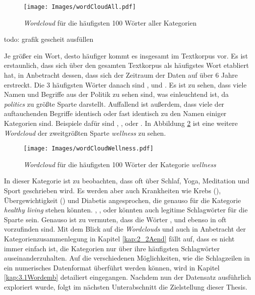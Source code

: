 \documentclass[a4paper,11pt]{article}
\begin{document}
\begin{figure}[ht]
    \centering
\texttt{[image: Images/wordCloudAll.pdf]} 
\label{abb:WordcloudAll}
\caption{\textit{Wordcloud} für die häufigsten 100 Wörter aller Kategorien}
\end{figure}
todo: grafik gescheit ausfüllen

Je größer ein Wort, desto häufiger kommt es insgesamt im Textkorpus vor. Es ist erstaunlich, dass  sich über den gesamten Textkorpus als häufigstes Wort etabliert hat, in Anbetracht dessen, dass sich der Zeitraum der Daten auf über $6$ Jahre erstreckt. Die $3$ häufigsten Wörter danach sind ,  und . Es ist zu sehen, dass viele Namen und Begriffe aus der Politik zu sehen sind, was einleuchtend ist, da \textit{politics} zu größte Sparte darstellt. 
Auffallend ist außerdem, dass viele der auftauchenden Begriffe identisch oder fast identisch zu den Namen einiger Kategorien sind. Beispiele dafür sind , ,  oder . In Abbildung \ref{abb:WordcloudWellness} ist eine weitere \textit{Wordcloud} der zweitgrößten Sparte \textit{wellness} zu sehen.


\begin{figure}[ht]
    \centering
\texttt{[image: Images/wordCloudWellness.pdf]} 
\label{abb:WordcloudWellness}
\caption{\textit{Wordcloud} für die häufigsten 100 Wörter der Kategorie \textit{wellness}}
\end{figure}

In dieser Kategorie ist zu beobachten, dass oft über Schlaf, Yoga, Meditation und Sport geschrieben wird. Es werden aber auch Krankheiten wie Krebs (), Übergewichtigkeit () und Diabetis angesprochen, die genauso für die Kategorie \textit{healthy living} stehen könnten. , ,  oder  könnten auch legitime Schlagwörter für die  Sparte sein. Genauso ist zu vermuten, dass die Wörter ,  und  ebenso in  oft vorzufinden sind. Mit dem Blick auf die \textit{Wordclouds} und auch in Anbetracht der Kategorienzusammenlegung in Kapitel \ref{kap:2_2Aend} fällt auf, dass es nicht immer einfach ist, die Kategorien nur über ihre häufigsten Schlagwörter auseinanderzuhalten. Auf die verschiedenen Möglichkeiten, wie die Schlagzeilen in ein numerisches Datenformat überführt werden können, wird in Kapitel \ref{kap:3.1Wordemb} detailiert eingegangen.
Nachdem nun der Datensatz ausführlich exploriert wurde, folgt im nächsten Unterabschnitt die Zielstellung dieser Thesis.
\end{document}
